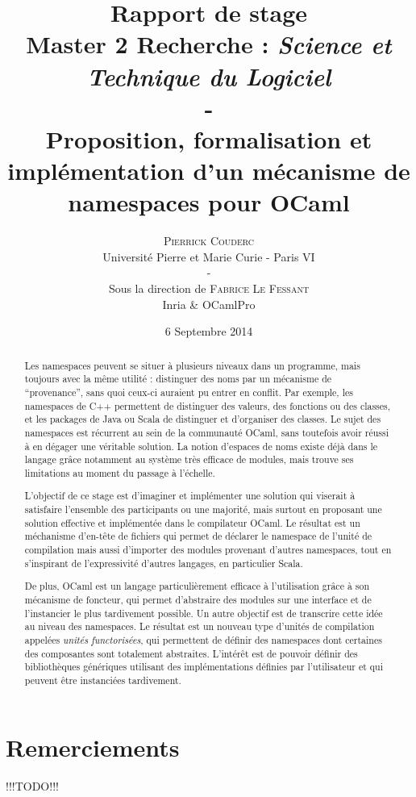 \documentclass[11pt,a4paper]{report}
\title{
  \textbf{Rapport de stage} \\
  Master 2 Recherche : \emph{Science et Technique du Logiciel}
  \\ - \\
  Proposition, formalisation et implémentation d'un mécanisme de namespaces
  pour OCaml\\ %
}
\author{\textsc{Pierrick Couderc} \\
  Université Pierre et Marie Curie - Paris VI \\ - \\
  Sous la direction de \textsc{Fabrice Le Fessant} \\
  Inria \& OCamlPro
}
\date{6 Septembre 2014}
\begin{document}
\maketitle

\section*{Remerciements}

!!!TODO!!!


\begin{abstract}
Les namespaces peuvent se situer à plusieurs niveaux dans un programme, mais
toujours avec la même utilité : distinguer des noms par un mécanisme de
``provenance'', sans quoi ceux-ci auraient pu entrer en conflit. Par exemple,
les namespaces de C++ permettent de distinguer des valeurs, des fonctions ou
des classes, et les packages de Java ou Scala de distinguer et d'organiser des
classes.  Le sujet des namespaces est récurrent au sein de la communauté OCaml,
sans toutefois avoir réussi à en dégager une véritable solution. La notion
d'espaces de noms existe déjà dans le langage grâce notamment au système très
efficace de modules, mais trouve ses limitations au moment du passage à
l'échelle. 

L'objectif de ce stage est d'imaginer et implémenter une solution qui
viserait à satisfaire l'ensemble des participants ou une majorité, mais surtout
en proposant une solution effective et implémentée dans le compilateur OCaml. Le
résultat est un méchanisme d'en-tête de fichiers qui permet de déclarer le
namespace de l'unité de compilation mais aussi d'importer des modules provenant
d'autres namespaces, tout en s'inspirant de l'expressivité d'autres langages, en
particulier Scala.

De plus, OCaml est un langage particulièrement efficace à l'utilisation grâce à
son mécanisme de foncteur, qui permet d'abstraire des modules sur une interface
et de l'instancier le plus tardivement possible. Un autre objectif est de
transcrire cette idée au niveau des namespaces. Le résultat est un nouveau type
d'unités de compilation appelées \emph{unités functorisées}, qui permettent de
définir des namespaces dont certaines des composantes sont totalement
abstraites. L'intérêt est de pouvoir définir des bibliothèques génériques
utilisant des implémentations définies par l'utilisateur et qui peuvent être
instanciées tardivement.
\end{abstract}

\tableofcontents
\end{document}
